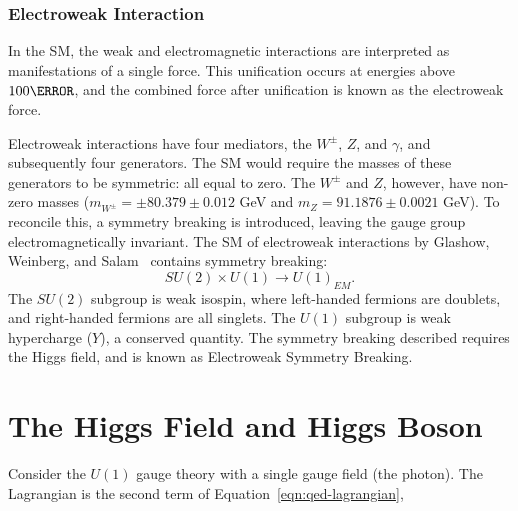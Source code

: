         \subsubsection{Electroweak Interaction}\label{sssec:ew-theory}

        In the \gls{SM}, the weak and electromagnetic interactions are interpreted as manifestations of a single force. This unification occurs at energies above $\unit{100}{\GeV}$, and the combined force after unification is known as the electroweak force.

        Electroweak interactions have four mediators, the $W^{\pm}$, $Z$, and $\gamma$, and subsequently four generators. The \gls{SM} would require the masses of these generators to be symmetric: all equal to zero. The $W^{\pm}$ and $Z$, however, have non-zero masses ($m_{W^{\pm}} = \pm80.379\pm0.012$ GeV and  $m_{Z}=91.1876\pm0.0021$ GeV). To reconcile this, a symmetry breaking is introduced, leaving the gauge group electromagnetically invariant. The \gls{SM} of electroweak interactions by Glashow, Weinberg, and Salam~\cite{Glashow:1959,Weinberg:1967,Salam1959} contains symmetry breaking:
        \begin{equation}
            SU(2) \times U(1) \rightarrow U(1)_{EM}.
        \end{equation}
        The $SU(2)$ subgroup is weak isospin, where left-handed fermions are doublets, and right-handed fermions are all singlets. The $U(1)$ subgroup is weak hypercharge ($Y$), a conserved quantity. The symmetry breaking described requires the Higgs field, and is known as Electroweak Symmetry Breaking.

\section{The Higgs Field and Higgs Boson}

Consider the $U(1)$ gauge theory with a single gauge field (the photon). The Lagrangian is the second term of Equation~\ref{eqn:qed-lagrangian},


